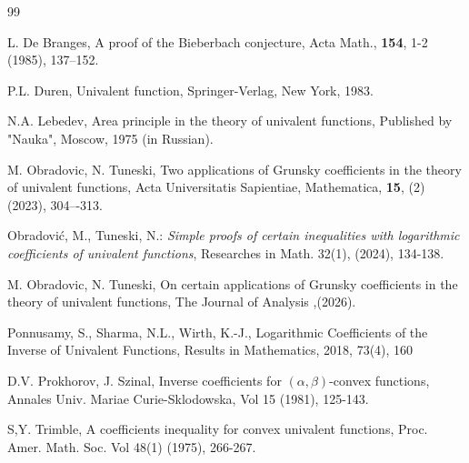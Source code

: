 \documentclass{amsart}
\begin{document}
\begin{thebibliography}{99}


 L. De Branges, A proof of the Bieberbach conjecture, Acta Math., {\bf 154}, 1-2 (1985), 137--152.

P.L. Duren, Univalent function, Springer-Verlag, New York, 1983.

N.A. Lebedev, Area principle in the theory of univalent functions, Published by "Nauka", Moscow, 1975 (in Russian).

M. Obradovic, N. Tuneski, Two applications of Grunsky coefficients in the theory of univalent functions, Acta Universitatis Sapientiae, Mathematica, \textbf{15}, (2) (2023), 304–-313.

Obradovi\'c, M., Tuneski, N.:  {\it Simple proofs of certain inequalities with logarithmic coefficients of univalent functions}, Researches in Math. 32(1), (2024), 134-138.

%
%

M. Obradovic, N. Tuneski, On certain applications of Grunsky coefficients in the theory of univalent functions,  The Journal of Analysis ,(2026).

Ponnusamy, S., Sharma, N.L., Wirth, K.-J.,
Logarithmic Coefficients of the Inverse of Univalent Functions,
Results in Mathematics, 2018, 73(4), 160


 D.V. Prokhorov, J. Szinal, Inverse coefficients for $(\alpha, \beta)$-convex functions, Annales Univ. Mariae Curie-Sklodowska, Vol 15 (1981), 125-143.

 S,Y. Trimble, A coefficients inequality for convex univalent functions, Proc. Amer. Math. Soc. Vol 48(1)
(1975), 266-267.









\end{thebibliography}
\end{document}
